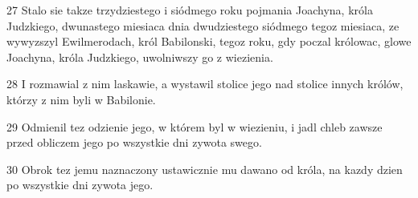 \par 27 Stalo sie takze trzydziestego i siódmego roku pojmania Joachyna, króla Judzkiego, dwunastego miesiaca dnia dwudziestego siódmego tegoz miesiaca, ze wywyzszyl Ewilmerodach, król Babilonski, tegoz roku, gdy poczal królowac, glowe Joachyna, króla Judzkiego, uwolniwszy go z wiezienia.
\par 28 I rozmawial z nim laskawie, a wystawil stolice jego nad stolice innych królów, którzy z nim byli w Babilonie.
\par 29 Odmienil tez odzienie jego, w którem byl w wiezieniu, i jadl chleb zawsze przed obliczem jego po wszystkie dni zywota swego.
\par 30 Obrok tez jemu naznaczony ustawicznie mu dawano od króla, na kazdy dzien po wszystkie dni zywota jego.


